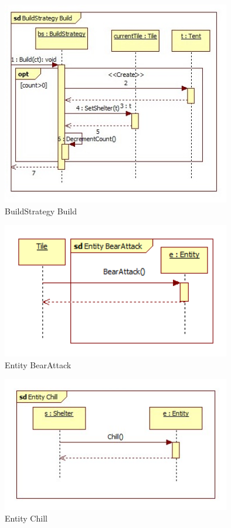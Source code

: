 \begin{figure}[H]
        \begin{center}
                \includegraphics[width=10cm]{chapters/chapter07/seqdiag/BuildStrategy_Build.jpg}
                \caption{BuildStrategy Build}
                \label{BuildStrategy Build}
        \end{center}
\end{figure}
\begin{figure}[H]
        \begin{center}
                \includegraphics[width=10cm]{chapters/chapter07/seqdiag/Entity_BearAttack.png}
                \caption{Entity BearAttack}
                \label{Entity BearAttack}
        \end{center}
\end{figure}
\begin{figure}[H]
        \begin{center}
                \includegraphics[width=10cm]{chapters/chapter07/seqdiag/Entity_Chill.jpg}
                \caption{Entity Chill}
                \label{Entity Chill}
        \end{center}
\end{figure}
